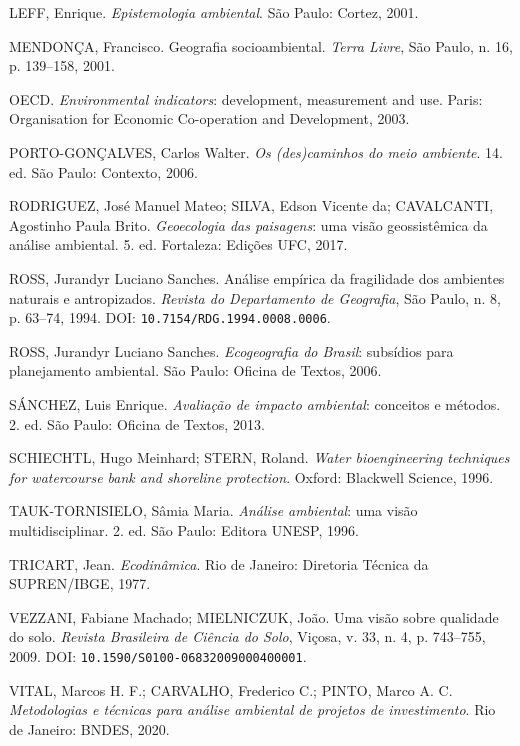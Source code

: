 \begin{list}{}{%
  \setlength{\leftmargin}{1.6em}%
  \setlength{\itemindent}{-1.6em}%
  \setlength{\itemsep}{4.5pt}%
  \setlength{\parsep}{0pt}%
  \setlength{\topsep}{4pt}%
}
  \item LEFF, Enrique. \textit{Epistemologia ambiental}. São Paulo: Cortez, 2001.

  \item MENDONÇA, Francisco. Geografia socioambiental. \textit{Terra Livre}, São Paulo, n. 16, p. 139--158, 2001.

  \item OECD. \textit{Environmental indicators}: development, measurement and use. Paris: Organisation for Economic Co-operation and Development, 2003.

  \item PORTO-GONÇALVES, Carlos Walter. \textit{Os (des)caminhos do meio ambiente}. 14. ed. São Paulo: Contexto, 2006.

  \item RODRIGUEZ, José Manuel Mateo; SILVA, Edson Vicente da; CAVALCANTI, Agostinho Paula Brito. \textit{Geoecologia das paisagens}: uma visão geossistêmica da análise ambiental. 5. ed. Fortaleza: Edições UFC, 2017.

  \item ROSS, Jurandyr Luciano Sanches. Análise empírica da fragilidade dos ambientes naturais e antropizados. \textit{Revista do Departamento de Geografia}, São Paulo, n. 8, p. 63--74, 1994. DOI: \texttt{10.7154/RDG.1994.0008.0006}.

  \item ROSS, Jurandyr Luciano Sanches. \textit{Ecogeografia do Brasil}: subsídios para planejamento ambiental. São Paulo: Oficina de Textos, 2006.

  \item SÁNCHEZ, Luis Enrique. \textit{Avaliação de impacto ambiental}: conceitos e métodos. 2. ed. São Paulo: Oficina de Textos, 2013.

  \item SCHIECHTL, Hugo Meinhard; STERN, Roland. \textit{Water bioengineering techniques for watercourse bank and shoreline protection}. Oxford: Blackwell Science, 1996.

  \item TAUK-TORNISIELO, Sâmia Maria. \textit{Análise ambiental}: uma visão multidisciplinar. 2. ed. São Paulo: Editora UNESP, 1996.

  \item TRICART, Jean. \textit{Ecodinâmica}. Rio de Janeiro: Diretoria Técnica da SUPREN/IBGE, 1977.

  \item VEZZANI, Fabiane Machado; MIELNICZUK, João. Uma visão sobre qualidade do solo. \textit{Revista Brasileira de Ciência do Solo}, Viçosa, v. 33, n. 4, p. 743--755, 2009. DOI: \texttt{10.1590/S0100-06832009000400001}.

  \item VITAL, Marcos H. F.; CARVALHO, Frederico C.; PINTO, Marco A. C. \textit{Metodologias e técnicas para análise ambiental de projetos de investimento}. Rio de Janeiro: BNDES, 2020.
\end{list}

